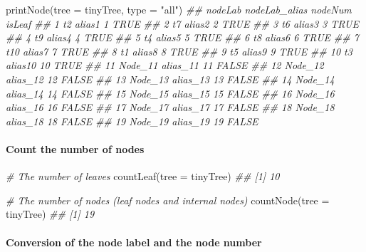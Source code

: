 \documentclass[]{article}
\newcommand{\hlstr}[1]{\textcolor[rgb]{0.251,0.627,0.251}{#1}}%
\newcommand{\hlcom}[1]{\textcolor[rgb]{0.502,0.502,0.502}{\textit{#1}}}%
\newcommand{\hlstd}[1]{\textcolor[rgb]{0.251,0.251,0.251}{#1}}%
\newcommand{\hlkwc}[1]{\textcolor[rgb]{0.251,0.251,0.251}{#1}}%
\newcommand{\hlkwd}[1]{\textcolor[rgb]{0.878,0.439,0.125}{#1}}%
\newenvironment{Shaded}{\begin{myshaded}}{\end{myshaded}}
\newcommand{\KeywordTok}[1]{\hlkwd{#1}}
\newcommand{\DataTypeTok}[1]{\hlkwc{#1}}
\newcommand{\StringTok}[1]{\hlstr{#1}}
\newcommand{\CommentTok}[1]{\hlcom{#1}}
\newcommand{\NormalTok}[1]{\hlstd{#1}}
\begin{document}
\begin{Shaded}
\begin{Highlighting}[]
\KeywordTok{printNode}\NormalTok{(}\DataTypeTok{tree =}\NormalTok{ tinyTree, }\DataTypeTok{type =} \StringTok{"all"}\NormalTok{)}
\CommentTok{##    nodeLab nodeLab_alias nodeNum isLeaf}
\CommentTok{## 1       t2        alias1       1   TRUE}
\CommentTok{## 2       t7        alias2       2   TRUE}
\CommentTok{## 3       t6        alias3       3   TRUE}
\CommentTok{## 4       t9        alias4       4   TRUE}
\CommentTok{## 5       t4        alias5       5   TRUE}
\CommentTok{## 6       t8        alias6       6   TRUE}
\CommentTok{## 7      t10        alias7       7   TRUE}
\CommentTok{## 8       t1        alias8       8   TRUE}
\CommentTok{## 9       t5        alias9       9   TRUE}
\CommentTok{## 10      t3       alias10      10   TRUE}
\CommentTok{## 11 Node_11      alias_11      11  FALSE}
\CommentTok{## 12 Node_12      alias_12      12  FALSE}
\CommentTok{## 13 Node_13      alias_13      13  FALSE}
\CommentTok{## 14 Node_14      alias_14      14  FALSE}
\CommentTok{## 15 Node_15      alias_15      15  FALSE}
\CommentTok{## 16 Node_16      alias_16      16  FALSE}
\CommentTok{## 17 Node_17      alias_17      17  FALSE}
\CommentTok{## 18 Node_18      alias_18      18  FALSE}
\CommentTok{## 19 Node_19      alias_19      19  FALSE}
\end{Highlighting}
\end{Shaded}

\hypertarget{count-the-number-of-nodes}{%
\paragraph{Count the number of nodes}\label{count-the-number-of-nodes}}

\begin{Shaded}
\begin{Highlighting}[]
\CommentTok{# The number of leaves}
\KeywordTok{countLeaf}\NormalTok{(}\DataTypeTok{tree =}\NormalTok{ tinyTree)}
\CommentTok{## [1] 10}

\CommentTok{# The number of nodes (leaf nodes and internal nodes)}
\KeywordTok{countNode}\NormalTok{(}\DataTypeTok{tree =}\NormalTok{ tinyTree)}
\CommentTok{## [1] 19}
\end{Highlighting}
\end{Shaded}

\hypertarget{conversion-of-the-node-label-and-the-node-number}{%
\paragraph{Conversion of the node label and the node number}\label{conversion-of-the-node-label-and-the-node-number}}
\end{document}
